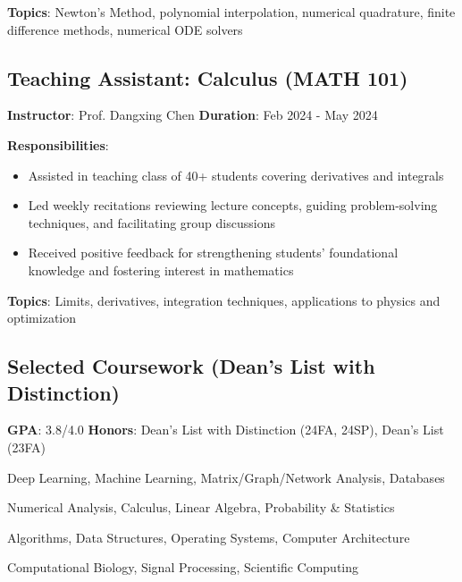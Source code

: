 \vspace{0.5em}

\textbf{Topics}: Newton's Method, polynomial interpolation, numerical quadrature, finite difference methods, numerical ODE solvers

\vspace{1.5em}


\subsection*{Teaching Assistant: Calculus (MATH 101)}

\textbf{Instructor}: Prof. Dangxing Chen \quad \textbf{Duration}: Feb 2024 - May 2024

\textbf{Responsibilities}:
\begin{itemize}[leftmargin=1.2em, itemsep=0.1em]
  \item Assisted in teaching class of 40+ students covering derivatives and integrals
  \item Led weekly recitations reviewing lecture concepts, guiding problem-solving techniques, and facilitating group discussions
  \item Received positive feedback for strengthening students' foundational knowledge and fostering interest in mathematics
\end{itemize}

\vspace{0.5em}

\textbf{Topics}: Limits, derivatives, integration techniques, applications to physics and optimization

\vspace{1.5em}


\subsection*{Selected Coursework (Dean's List with Distinction)}

\textbf{GPA}: 3.8/4.0 \quad \textbf{Honors}: Dean's List with Distinction (24FA, 24SP), Dean's List (23FA)

\begin{description}[leftmargin=5em, labelwidth=4.5em, labelsep=0.5em]
  \item[A+ Courses:] Deep Learning, Machine Learning, Matrix/Graph/Network Analysis, Databases
  \item[Mathematics:] Numerical Analysis, Calculus, Linear Algebra, Probability \& Statistics
  \item[Computer Science:] Algorithms, Data Structures, Operating Systems, Computer Architecture
  \item[Applied:] Computational Biology, Signal Processing, Scientific Computing
\end{description}
